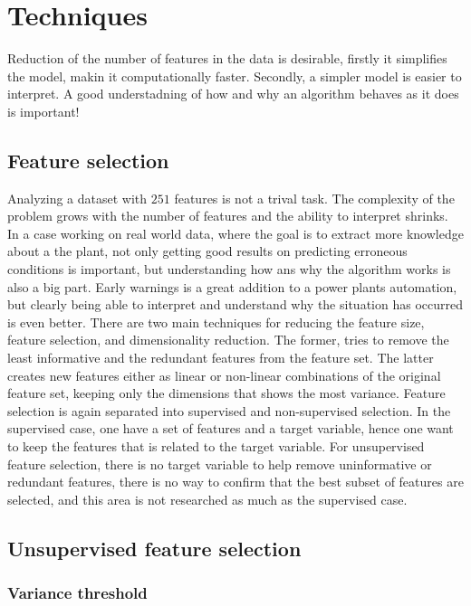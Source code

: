 \chapter{Techniques}\label{chap:techniques}

Reduction of the number of features in the data is desirable, firstly it simplifies the model, makin it computationally faster. Secondly, a simpler model is easier to interpret. A good understadning of how and why an algorithm behaves as it does is important! 

\section{Feature selection}\label{sec:feature_selec}
    Analyzing a dataset with $251$ features is not a trival task. The complexity of the problem grows with the number of features and the ability to interpret shrinks. In a case working on real world data, where the goal is to extract more knowledge about a the plant, not only getting good results on predicting erroneous conditions is important, but understanding how ans why the algorithm works is also a big part. Early warnings is a great addition to a power plants automation, but clearly being able to interpret and understand why the situation has occurred is even better. There are two main techniques for reducing the feature size, feature selection, and dimensionality reduction. The former, tries to remove the least informative and the redundant features from the feature set. The latter creates new features either as linear or non-linear combinations of the original feature set, keeping only the dimensions that shows the most variance. Feature selection is again separated into supervised and non-supervised selection. In the supervised case, one have a set of features and a target variable, hence one want to keep the features that is related to the target variable. For unsupervised feature selection, there is no target variable to help remove uninformative or redundant features, there is no way to confirm that the best subset of features are selected, and this area is not researched as much as the supervised case.     


\section{Unsupervised feature selection}\label{sec:unsup_feat_reduc}
    
    \subsection{Variance threshold}\label{subsec:var_thres}
    
